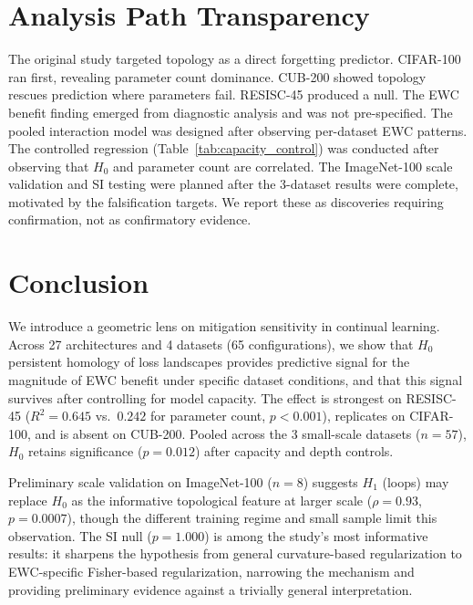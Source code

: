 \documentclass{article}
\begin{document}
\section{Analysis Path Transparency}
\label{sec:transparency}

The original study targeted topology as a direct forgetting predictor. CIFAR-100 ran first, revealing parameter count dominance. CUB-200 showed topology rescues prediction where parameters fail. RESISC-45 produced a null. The EWC benefit finding emerged from diagnostic analysis and was not pre-specified. The pooled interaction model was designed after observing per-dataset EWC patterns. The controlled regression (Table~\ref{tab:capacity_control}) was conducted after observing that $H_0$ and parameter count are correlated. The ImageNet-100 scale validation and SI testing were planned after the 3-dataset results were complete, motivated by the falsification targets. We report these as discoveries requiring confirmation, not as confirmatory evidence.

\section{Conclusion}
\label{sec:conclusion}

We introduce a geometric lens on mitigation sensitivity in continual learning. Across 27 architectures and 4 datasets (65 configurations), we show that $H_0$ persistent homology of loss landscapes provides predictive signal for the magnitude of EWC benefit under specific dataset conditions, and that this signal survives after controlling for model capacity. The effect is strongest on RESISC-45 ($R^2 = 0.645$ vs.\ $0.242$ for parameter count, $p < 0.001$), replicates on CIFAR-100, and is absent on CUB-200. Pooled across the 3 small-scale datasets ($n = 57$), $H_0$ retains significance ($p = 0.012$) after capacity and depth controls.

Preliminary scale validation on ImageNet-100 ($n = 8$) suggests $H_1$ (loops) may replace $H_0$ as the informative topological feature at larger scale ($\rho = 0.93$, $p = 0.0007$), though the different training regime and small sample limit this observation. The SI null ($p = 1.000$) is among the study's most informative results: it sharpens the hypothesis from general curvature-based regularization to EWC-specific Fisher-based regularization, narrowing the mechanism and providing preliminary evidence against a trivially general interpretation.
\end{document}
